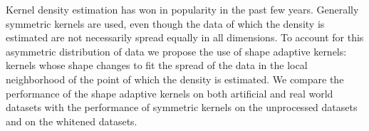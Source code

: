 \noindent Kernel density estimation has won in popularity in the past few years. 
Generally symmetric kernels are used, even though the data of which the density is estimated are not necessarily spread equally in all dimensions. To account for this asymmetric distribution of data we propose the use of shape adaptive kernels: kernels whose shape changes to fit the spread of the data in the local neighborhood of the point of which the density is estimated.
We compare the performance of the shape adaptive kernels on both artificial and real world datasets with the performance of symmetric kernels on the unprocessed datasets and on the whitened datasets.
